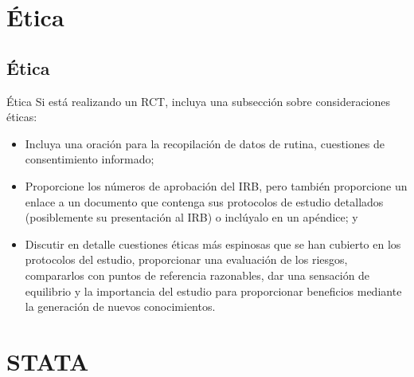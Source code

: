 \documentclass[11pt, aspectratio=169, compress]{beamer}
\begin{document}
\section{Ética}
\subsection{Ética}

\begin{frame}{Ética}
  Si está realizando un RCT, incluya una subsección sobre consideraciones éticas:

  \begin{itemize}
    \item Incluya una oración para la recopilación de datos de rutina, cuestiones de consentimiento informado;

    \item Proporcione los números de aprobación del IRB, pero también proporcione un enlace a un documento que contenga sus protocolos de estudio detallados (posiblemente su presentación al IRB) o inclúyalo en un apéndice; y
    
    \item Discutir en detalle cuestiones éticas más espinosas que se han cubierto en los protocolos del estudio, proporcionar una evaluación de los riesgos, compararlos con puntos de referencia razonables, dar una sensación de equilibrio y la importancia del estudio para proporcionar beneficios mediante la generación de nuevos conocimientos.
  \end{itemize}
  
\end{frame}
\section{STATA}
\end{document}
